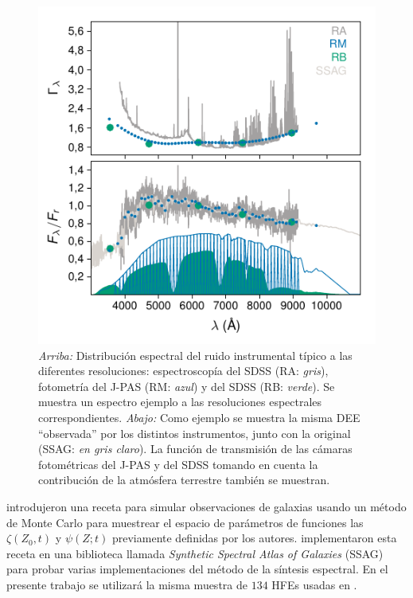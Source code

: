 \begin{figure}
\includegraphics{figures/sigma-spectrum}
%
\caption{\emph{Arriba:} Distribución espectral del ruido instrumental típico a las diferentes
resoluciones: espectroscopía del SDSS (RA: \emph{gris}), fotometría del J-PAS (RM: \emph{azul}) y
del SDSS (RB: \emph{verde}). Se muestra un espectro ejemplo a las resoluciones espectrales
correspondientes. \emph{Abajo:} Como ejemplo se muestra la misma DEE ``observada'' por los distintos
instrumentos, junto con la original (SSAG: \emph{en gris claro}). La función de transmisión de las
cámaras fotométricas del J-PAS y del SDSS tomando en cuenta la contribución de la atmósfera
terrestre también se muestran.}
%
\label{fig:sigma-spectrum}
\end{figure}

\citet{Chen2012} introdujeron una receta para simular observaciones de galaxias usando un método de
Monte Carlo para muestrear el espacio de parámetros de funciones las $\zeta(Z_0,t)$ y $\psi(Z;t)$
previamente definidas por los autores. \citet{Magris2015} implementaron esta receta en una
biblioteca llamada \emph{Synthetic Spectral Atlas of Galaxies} (SSAG) para probar varias
implementaciones del método de la síntesis espectral. En el presente trabajo se utilizará la misma
muestra de $134$ HFEs usadas en \citet{Magris2015}.

